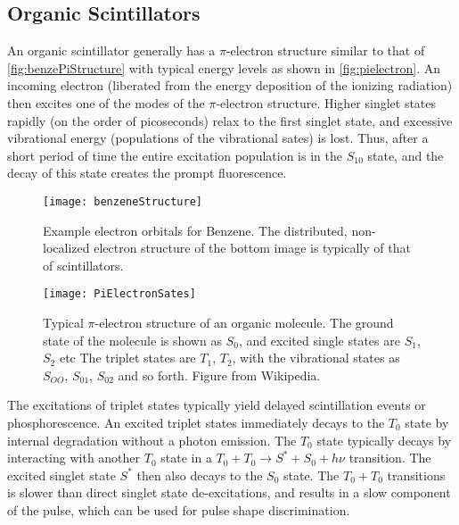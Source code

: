 \subsection{Organic Scintillators}
\label{sec:OrganicScinillators}
An organic scintillator generally has a $\pi$-electron structure similar to that of \autoref{fig:benzePiStructure} with typical energy levels as shown in \autoref{fig:pielectron}.
An incoming electron (liberated from the energy deposition of the ionizing radiation) then excites one of the modes of the $\pi$-electron structure.
Higher singlet states rapidly (on the order of picoseconds) relax to the first singlet state, and excessive vibrational energy (populations of the vibrational sates) is lost.
Thus, after a short period of time the entire excitation population is in the $S_{10}$ state, and the decay of this state creates the prompt fluorescence.
\begin{figure}
	\centering
	\texttt{[image: benzeneStructure]}
	\caption[Example orbitals for Benzene]{Example electron orbitals for Benzene.  The distributed, non-localized electron structure of the bottom image is typically of that of scintillators.}
	\label{fig:benzePiStructure}
\end{figure}
\begin{figure}
  \centering
  \texttt{[image: PiElectronSates]}
  \caption[$\pi$ Electron Structure]{Typical $\pi$-electron structure of an organic molecule. The ground state of the molecule is shown as $S_0$, and excited single states are $S_1$, $S_2$ etc The triplet states are $T_1$, $T_2$, with the vibrational states as $S_{OO}$, $S_{01}$, $S_{02}$ and so forth. Figure from Wikipedia.}
  \label{fig:pielectron}
\end{figure}
The excitations of triplet states typically yield delayed scintillation events or phosphorescence.
An excited triplet states immediately decays to the $T_0$ state by internal degradation without a photon emission.
The $T_0$ state typically decays by interacting with another $T_0$ state in a $T_0 + T_0 \to S^* + S_0 + h\nu$ transition.
The excited singlet state $S^*$ then also decays to the $S_0$ state.
The $T_0 + T_0$ transitions is slower than direct singlet state de-excitations, and results in a slow component of the pulse, which can be used for pulse shape discrimination.

